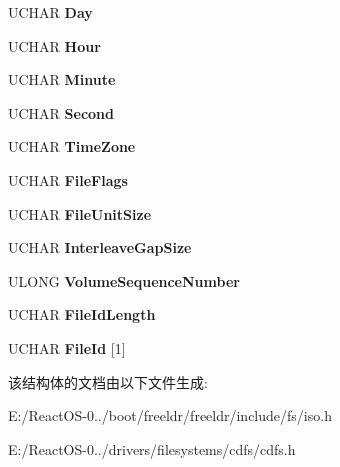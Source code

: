 \begin{DoxyCompactItemize}
\mbox{\label{struct___d_i_r___r_e_c_o_r_d_aeb5ee5a05985af88f5dfe2fe1ae909bf}} 
U\+C\+H\+AR {\bfseries Day}
\item 
\mbox{\label{struct___d_i_r___r_e_c_o_r_d_a789a297445189687a1cf8b70b2d9c8a3}} 
U\+C\+H\+AR {\bfseries Hour}
\item 
\mbox{\label{struct___d_i_r___r_e_c_o_r_d_a984ec8ab87ba4f4a5bbb86679d9bcc29}} 
U\+C\+H\+AR {\bfseries Minute}
\item 
\mbox{\label{struct___d_i_r___r_e_c_o_r_d_acf9a375f76c130218f8903c8b83e07da}} 
U\+C\+H\+AR {\bfseries Second}
\item 
\mbox{\label{struct___d_i_r___r_e_c_o_r_d_a1cedbcee1221625d85cf26840630b1b5}} 
U\+C\+H\+AR {\bfseries Time\+Zone}
\item 
\mbox{\label{struct___d_i_r___r_e_c_o_r_d_a1fcbeb01daf279dbc745897de818cb68}} 
U\+C\+H\+AR {\bfseries File\+Flags}
\item 
\mbox{\label{struct___d_i_r___r_e_c_o_r_d_a8cb891beca868b6ccddf75cc5ea9d1c3}} 
U\+C\+H\+AR {\bfseries File\+Unit\+Size}
\item 
\mbox{\label{struct___d_i_r___r_e_c_o_r_d_a94299cd966c58b02607018fc8e3a8687}} 
U\+C\+H\+AR {\bfseries Interleave\+Gap\+Size}
\item 
\mbox{\label{struct___d_i_r___r_e_c_o_r_d_a44798147c6f66f04665bbdf0cbb8a129}} 
U\+L\+O\+NG {\bfseries Volume\+Sequence\+Number}
\item 
\mbox{\label{struct___d_i_r___r_e_c_o_r_d_a1fcbd70fd7c99830693ad981fdbcb189}} 
U\+C\+H\+AR {\bfseries File\+Id\+Length}
\item 
\mbox{\label{struct___d_i_r___r_e_c_o_r_d_a870bc58a3719f58215e06befa73123b2}} 
U\+C\+H\+AR {\bfseries File\+Id} \mbox{[}1\mbox{]}
\end{DoxyCompactItemize}


该结构体的文档由以下文件生成\+:\begin{DoxyCompactItemize}
\item 
E\+:/\+React\+O\+S-\/0../boot/freeldr/freeldr/include/fs/iso.\+h\item 
E\+:/\+React\+O\+S-\/0../drivers/filesystems/cdfs/cdfs.\+h\end{DoxyCompactItemize}
